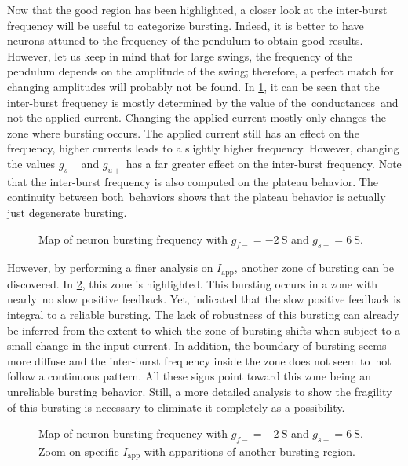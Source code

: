 Now that the good region has been highlighted, a closer look at the inter-burst frequency will be useful to categorize bursting.
Indeed, it is better to have neurons attuned to the frequency of the pendulum to obtain good results.
However, let us keep in mind that for large swings, the frequency of the pendulum depends on the amplitude of the swing; therefore, a perfect match for changing amplitudes will probably not be found.
In \cref{fig:neuron_burts}, it can be seen that the inter-burst frequency is mostly determined by the value of the conductances and not the applied current.
Changing the applied current mostly only changes the zone where bursting occurs.
The applied current still has an effect on the frequency, higher currents leads to a slightly higher frequency.
However, changing the values $g_{s-}$ and $g_{u+}$ has a far greater effect on the inter-burst frequency.
Note that the inter-burst frequency is also computed on the plateau behavior.
The continuity between both behaviors shows that the plateau behavior is actually just degenerate bursting.

\begin{figure}[!htb]
    \centering
    \caption{Map of neuron bursting frequency with $g_{f-} = \qty{-2}{\siemens}$ and $g_{s+} =  \qty{6}{\siemens}$.}
    \label{fig:neuron_burts}
\end{figure}

However, by performing a finer analysis on $I_\text{app}$, another zone of bursting can be discovered.
In \cref{fig:neuron_burts_fragile}, this zone is highlighted.
This bursting occurs in a zone with nearly no slow positive feedback.
Yet,\citet{burstingSlowFeedback} indicated that the slow positive feedback is integral to a reliable bursting.
The lack of robustness of this bursting can already be inferred from the extent to which the zone of bursting shifts when subject to a small change in the input current.
In addition, the boundary of bursting seems more diffuse and the inter-burst frequency inside the zone does not seem to not follow a continuous pattern.
All these signs point toward this zone being an unreliable bursting behavior.
Still, a more detailed analysis to show the fragility of this bursting is necessary to eliminate it completely as a possibility.

\begin{figure}[!htb]
    \centering
    \caption{Map of neuron bursting frequency with $g_{f-} = \qty{-2}{\siemens}$ and $g_{s+} =  \qty{6}{\siemens}$. Zoom on specific $I_\text{app}$ with apparitions of another bursting region.}
    \label{fig:neuron_burts_fragile}
\end{figure}

